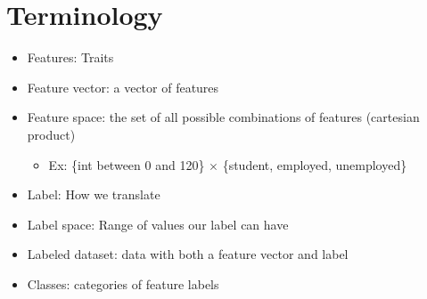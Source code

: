 \documentclass[10pt, oneside]{article}
\begin{document}
\section{Terminology}
\begin{itemize}
    \item Features: Traits
    \item Feature vector: a vector of features
    \item Feature space: the set of all possible combinations of features (cartesian product)
    \begin{itemize}
        \item Ex: \{int between 0 and 120\} $\times$ \{student, employed, unemployed\}
    \end{itemize}
    \item Label: How we translate
    \item Label space: Range of values our label can have
    \item Labeled dataset: data with both a feature vector and label
    \item Classes: categories of feature labels
\end{itemize}
\end{document}
